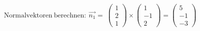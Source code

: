 \documentclass[preview]{standalone}
\begin{document}
\begin{center}
$\mathrm{Normalvektoren \: berechnen:} \: \vec{n_1} = \:\begin{pmatrix} 1 \\ 2 \\ 1 \end{pmatrix} \times \begin{pmatrix} 1 \\ -1 \\ 2 \end{pmatrix} = \begin{pmatrix} 5 \\ -1 \\ -3 \end{pmatrix}$
\end{center}
\end{document}
